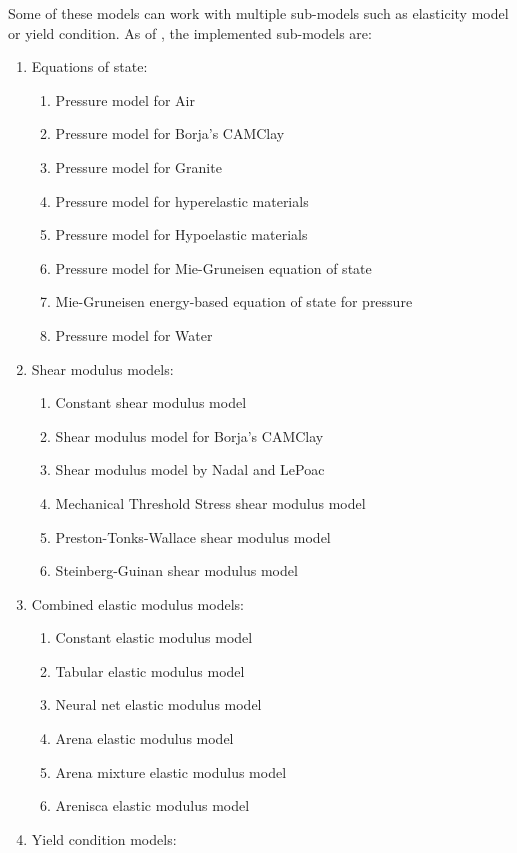 Some of these models can work with multiple sub-models such as elasticity model
or yield condition.  As of \Vaango \bbversion, the implemented sub-models are:
\begin{enumerate}
  \item Equations of state:
  \begin{enumerate}
    \item Pressure model for Air
    \item Pressure model for Borja's CAMClay
    \item Pressure model for Granite
    \item Pressure model for hyperelastic materials
    \item Pressure model for Hypoelastic materials
    \item Pressure model for Mie-Gruneisen equation of state
    \item Mie-Gruneisen energy-based equation of state for pressure
    \item Pressure model for Water
  \end{enumerate}
  \item Shear modulus models:
  \begin{enumerate}
    \item Constant shear modulus model
    \item Shear modulus model for Borja's CAMClay
    \item Shear modulus model by Nadal and LePoac
    \item Mechanical Threshold Stress shear modulus model
    \item Preston-Tonks-Wallace shear modulus model
    \item Steinberg-Guinan shear modulus model
  \end{enumerate}
  \item Combined elastic modulus models:
  \begin{enumerate}
    \item Constant elastic modulus model
    \item Tabular elastic modulus model
    \item Neural net elastic modulus model
    \item Arena elastic modulus model
    \item Arena mixture elastic modulus model
    \item Arenisca elastic modulus model
  \end{enumerate}
  \item Yield condition models:
  \begin{enumerate}

\end{enumerate}
\end{enumerate}
